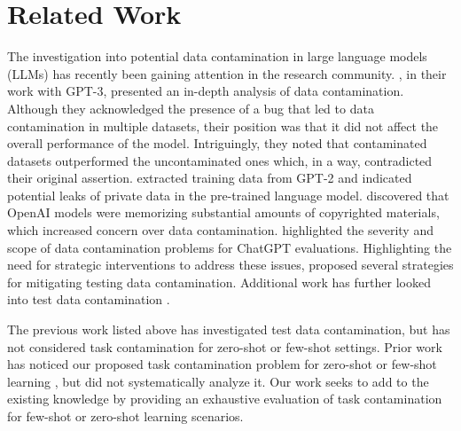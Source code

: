 \documentclass[letterpaper]{article} %
\newcommand{\jmfb}[1]{}      %
\begin{document}
\jmfb{Contamination Analysis Difficulties with Web Data: Difficult to definitely decide if dataset is included unless we have the whole dataset (like OPT).  Still difficult without links.  Cannot always rely on model to reproduce data, since need to be paired with labels. Formatting can cause issues.}

\jmfb{Difficulties with Closed Dataset Models like GPT and ChatGPT that have been fine-tuned on dataset we don't know about.  They can have contamination issues.  Open models like Alpaca and Vicuna help to diagnose contamination issues.}



\section{Related Work}


The investigation into potential data contamination in large language models (LLMs) has recently been gaining attention in the research community. \citet{brown2020}, in their work with GPT-3, presented an in-depth analysis of data contamination. Although they acknowledged the presence of a bug that led to data contamination in multiple datasets, their position was that it did not affect the overall performance of the model. Intriguingly, they noted that contaminated datasets outperformed the uncontaminated ones which, in a way, contradicted their original assertion. \citet{magar2022} extracted training data from GPT-2 and indicated potential leaks of private data in the pre-trained language model. \citet{chang2023} discovered that OpenAI models were memorizing substantial amounts of copyrighted materials, which increased concern over data contamination. \citet{aiyappa2023} highlighted the severity and scope of data contamination problems for ChatGPT evaluations. Highlighting the need for strategic interventions to address these issues, \citet{jacovi2023} proposed several strategies for mitigating testing data contamination. Additional work has further looked into test data contamination \cite{lm-contamination, zhou2023, golchin2023, sainz2023, deng2023investigating, oren2023proving, li2023}.

The previous work listed above has investigated test data contamination, but has not considered task contamination for zero-shot or few-shot settings. Prior work has noticed our proposed task contamination problem for zero-shot or few-shot learning \cite{blevins2023, briakou2023}, but did not systematically analyze it. Our work seeks to add to the existing knowledge by providing an exhaustive evaluation of task contamination for few-shot or zero-shot learning scenarios. %
\end{document}
